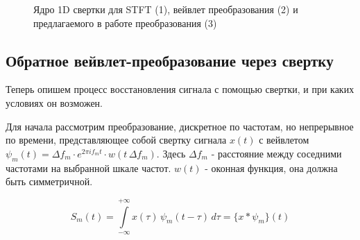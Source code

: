 \begin{figure}
  \centering
  \caption{Ядро 1D свертки для STFT (1), вейвлет преобразования (2) и предлагаемого в работе преобразования (3)}
  \label{fig:stft_kernel}
\end{figure}


\subsection{Обратное вейвлет-преобразование через свертку}
Теперь опишем процесс восстановления сигнала с помощью свертки, и при каких условиях он возможен.

Для начала рассмотрим преобразование, дискретное по частотам, но непрерывное по времени, 
представляющее собой свертку сигнала $x(t)$ с вейвлетом $\psi_m(t) = \Delta f_m \cdot e^{2\pi i f_m t} \cdot w(t\,\Delta f_m)$.
Здесь $\Delta f_m$ - расстояние между соседними частотами на выбранной шкале частот. $w(t)$ - оконная функция, она должна быть симметричной.

\begin{equation}
  S_m(t)=\int \limits _{-\infty}^{+\infty}x(\tau)\,\psi_m(t - \tau)\,d\tau = \{x * \psi_m\}(t)
  \label{eq:conv_x_psi}
\end{equation}


